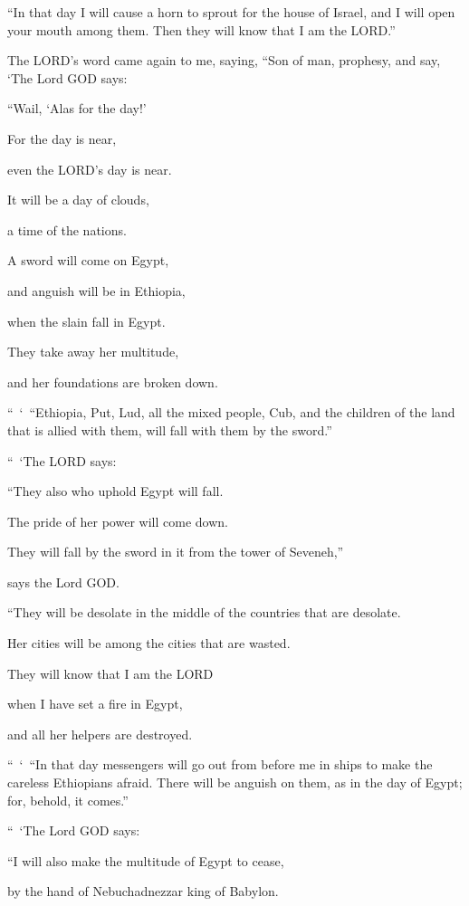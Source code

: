\myverse{}“In that day I will cause a horn to sprout for the house of
Israel, and I will open your mouth among them. Then they will know that I am the LORD.”


\mychapter{} \myverse*{}The LORD’s word came again to me, saying,
\myverse{}“Son of man, prophesy, and say, ‘The Lord GOD says:

\quad\quad “Wail, ‘Alas for the day!’

\myverse{}For the day is near,

even the LORD’s day is near.

It will be a day of clouds,

a time of the nations.

\myverse{}A sword will come on Egypt,

and anguish will be in Ethiopia,

when the slain fall in Egypt.

They take away her multitude,

and her foundations are broken down.

\myverse{}“ ‘ “Ethiopia, Put, Lud, all the mixed people, Cub, and the children
of the land that is allied with them, will fall with them by the sword.”

\myverse{}“ ‘The LORD says:

“They also who uphold Egypt will fall.

The pride of her power will come down.

They will fall by the sword in it from the tower of Seveneh,”

says the Lord GOD.

\myverse{}“They will be desolate in the middle of the countries that are
desolate.

Her cities will be among the cities that are wasted.

\myverse{}They will know that I am the LORD

when I have set a fire in Egypt,

and all her helpers are destroyed.

\myverse{}“ ‘ “In that day messengers will go out from before me in ships
to make the careless Ethiopians afraid. There will be anguish on them, as in the day of Egypt; for, behold,
it comes.”

\myverse{}“ ‘The Lord GOD says:

“I will also make the multitude of Egypt to cease,

by the hand of Nebuchadnezzar king of Babylon.

